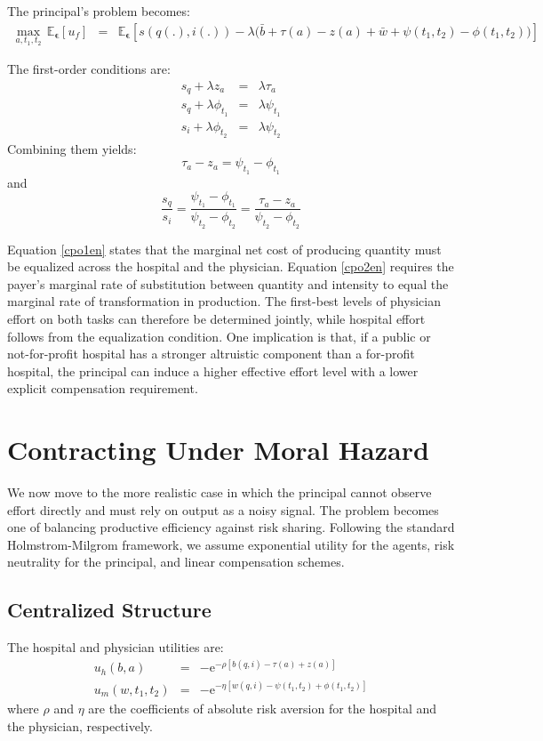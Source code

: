 ﻿\documentclass[12pt,letterpaper]{article}
\newcommand{\e}{\mathrm{e}}
\begin{document}
The principal's problem becomes:
\begin{eqnarray*}\label{maxf05en}
\nonumber \max\limits_{a,t_1,t_2}\,
\mathbb{E}_{\bm{\epsilon}}[u_f]
&=&
\mathbb{E}_{\bm{\epsilon}}
\left[
s(q(.),i(.))-\lambda\big(\bar{b}+\tau(a)-z(a)+\bar{w}+\psi(t_1,t_2)-\phi(t_1,t_2)\big)
\right]
\end{eqnarray*}

The first-order conditions are:
\begin{eqnarray}
  s_q+\lambda z_a &=& \lambda\tau_a \\
  s_q+\lambda\phi_{t_1} &=& \lambda\psi_{t_1} \\
  s_i+\lambda\phi_{t_2} &=& \lambda\psi_{t_2}
\end{eqnarray}
Combining them yields:
\begin{equation}\label{cpo1en}
    \tau_a-z_a=\psi_{t_1}-\phi_{t_1}
\end{equation}
and
\begin{equation}\label{cpo2en}
\frac{s_q}{s_i}=
\frac{\psi_{t_1}-\phi_{t_1}}{\psi_{t_2}-\phi_{t_2}}=
\frac{\tau_a-z_a}{\psi_{t_2}-\phi_{t_2}}
\end{equation}

Equation \ref{cpo1en} states that the marginal net cost of producing quantity must be equalized across the hospital and the physician. Equation \ref{cpo2en} requires the payer's marginal rate of substitution between quantity and intensity to equal the marginal rate of transformation in production. The first-best levels of physician effort on both tasks can therefore be determined jointly, while hospital effort follows from the equalization condition. One implication is that, if a public or not-for-profit hospital has a stronger altruistic component than a for-profit hospital, the principal can induce a higher effective effort level with a lower explicit compensation requirement.

\section{Contracting Under Moral Hazard}
We now move to the more realistic case in which the principal cannot observe effort directly and must rely on output as a noisy signal. The problem becomes one of balancing productive efficiency against risk sharing. Following the standard Holmstrom-Milgrom framework, we assume exponential utility for the agents, risk neutrality for the principal, and linear compensation schemes.

\subsection{Centralized Structure}
The hospital and physician utilities are:
\begin{eqnarray*}
  u_h(b,a) &=& -\e^{-\rho[b(q,i)-\tau(a)+z(a)]} \\
  u_m(w,t_1,t_2) &=& -\e^{-\eta[w(q,i)-\psi(t_1,t_2)+\phi(t_1,t_2)]}
\end{eqnarray*}
where $\rho$ and $\eta$ are the coefficients of absolute risk aversion for the hospital and the physician, respectively.
\end{document}
